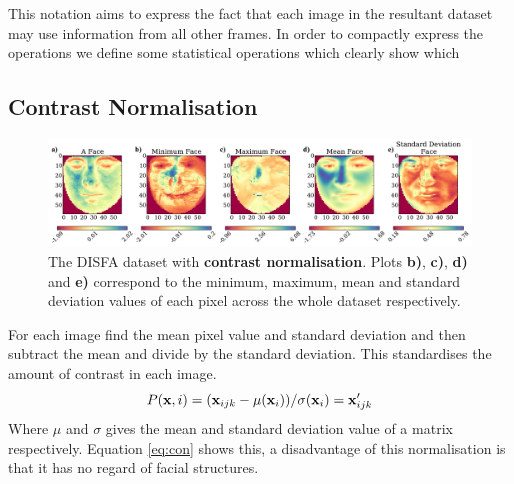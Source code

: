 This notation aims to express the fact that each image in the resultant dataset
may use information from all other frames. In order to compactly express the operations
we define some statistical operations which clearly show which

\subsection{Contrast Normalisation}
\begin{figure}[!h]
\centering
\includegraphics[width =\hsize]{figures/faces_contrast.pdf}
\caption{The DISFA dataset with {\bf contrast normalisation}.
Plots {\bf b)}, {\bf c)}, {\bf d)} and {\bf e)} correspond to the minimum,
maximum, mean and standard deviation values of each pixel across the whole
dataset respectively.}
\label{fig:simple}
\end{figure}

For each image find the mean pixel value and standard deviation and then subtract the mean
and divide by the standard deviation. This standardises the amount of contrast in each image.
\begin{equation}
   P({\bf x},i)= ({\bf x}_{ijk} - \mu({\bf x}_{i}))/\sigma ({\bf x}_{i}) = {\bf x}_{ijk}'
   \label{eq:con}
\end{equation}
Where $\mu$ and $\sigma$ gives the mean and standard deviation value of a matrix respectively.
Equation \ref{eq:con} shows this, a disadvantage of this normalisation is that it
has no regard of facial structures.
